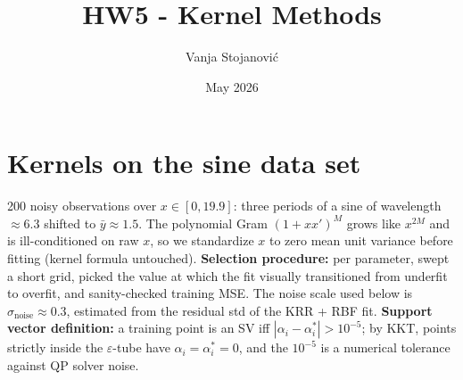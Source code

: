 \documentclass[10pt, a4paper]{article}
\title{\textbf{HW5 - Kernel Methods}}
\author{Vanja Stojanovi\'c}
\date{May 2026}
\begin{document}
\maketitle

\section{Kernels on the sine data set}

200 noisy observations over $x \in [0, 19.9]$: three periods of a sine of wavelength $\approx 6.3$ shifted to $\bar y \approx 1.5$. The polynomial Gram $(1{+}xx')^M$ grows like $x^{2M}$ and is ill-conditioned on raw $x$, so we standardize $x$ to zero mean unit variance before fitting (kernel formula untouched). \textbf{Selection procedure:} per parameter, swept a short grid, picked the value at which the fit visually transitioned from underfit to overfit, and sanity-checked training MSE. The noise scale used below is $\hat\sigma_{\text{noise}} \approx 0.3$, estimated from the residual std of the KRR + RBF fit. \textbf{Support vector definition:} a training point is an SV iff $|\alpha_i - \alpha_i^\ast| > 10^{-5}$; by KKT, points strictly inside the $\varepsilon$-tube have $\alpha_i = \alpha_i^\ast = 0$, and the $10^{-5}$ is a numerical tolerance against QP solver noise.
\end{document}
